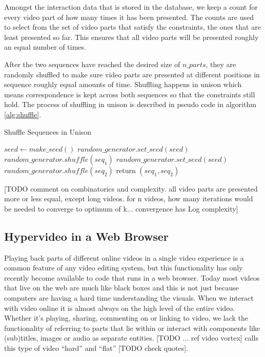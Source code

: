 Amongst the interaction data that is stored in the database, we keep a count for every video part of how many times it has been presented. The counts are used to select from the set of video parts that satisfy the constraints, the ones that are least presented so far. This ensures that all video parts will be presented roughly an equal number of times.

After the two sequences have reached the desired size of $n\_parts$, they are randomly shuffled to make sure video parts are presented at different positions in sequence roughly equal amounts of time. Shuffling happens in unison which means correspondence is kept across both sequences so that the constraints still hold. The process of shuffling in unison is described in pseudo code in algorithm \ref{alg:shuffle}.

\begin{algorithm}
  \caption{Shuffle Sequences in Unison}
  \begin{algorithmic}[1]
      \State $seed \gets make\_seed()$ 
      \State $random\_generator.set\_seed(seed)$ 
      \State $random\_generator.shuffle(seq_1)$ 
      \State $random\_generator.set\_seed(seed)$ 
      \State $random\_generator.shuffle(seq_2)$ 
      \State return $(seq_1, seq_2)$
    \EndProcedure
  \end{algorithmic}
  \label{alg:shuffle}
\end{algorithm}

[TODO comment on combinatorics and complexity. all video parts are presented more or less equal, except long videos. for n videos, how many iterations would be needed to converge to optimum of k... convergence has Log complexity]

\subsection{Hypervideo in a Web Browser}

Playing back parts of different online videos in a single video experience is a common feature of any video editing system, but this functionality has only recently become available to code that runs in a web browser. Today most videos that live on the web are much like black boxes and this is not just because computers are having a hard time understanding the visuals. When we interact with video online it is almost always on the high level of the entire video. Whether it's playing, sharing, commenting on or linking to video, we lack the functionality of referring to parts that lie within or interact with components like (sub)titles, images or audio as separate entities. [TODO ... ref video vortex] calls this type of video ``hard'' and ``flat'' [TODO check quotes].

